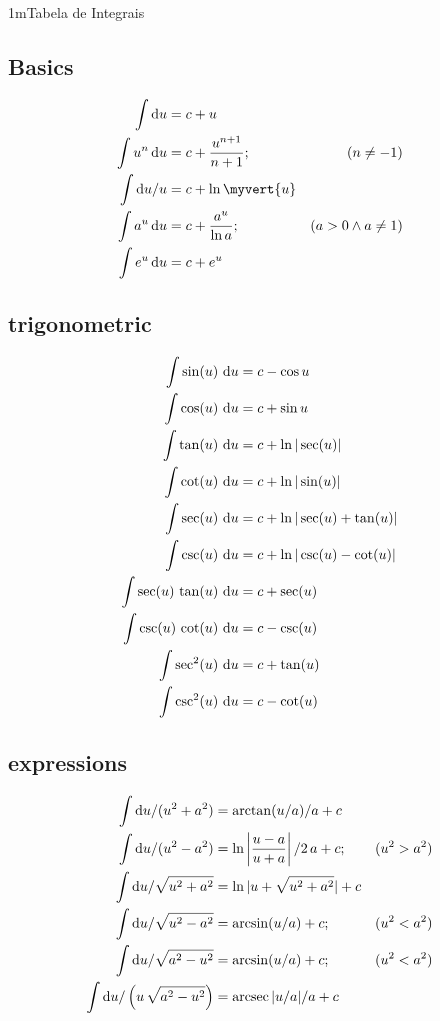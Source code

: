 \documentclass["AM3C-Slides_annotations.tex"]{subfiles}
\begin{document}
\begin{sectionBox}1m{Tabela de Integrais} %
  \subsection*{Basics}
  \begin{align}
       \int       \odif{u}    &= c + u 
    \\ \int   u^n \odif{u}    &= c + \frac{u^{n+1}}{n+1} ;& (n \neq -1) 
    \\ \int \odif{u}/u        &= c + \ln\myvert{u}
    \\ \int   a^u \odif{u}    &= c + \frac{a^u}{\ln{a}} ;& (a > 0 \land a \neq 1)
    \\ \int   e^u \odif{u}    &= c + e^u
  \end{align}

  \subsection*{trigonometric}
    \begin{align}
         \int \sin(u)\,         \odif{u}&= c - \cos{u}
      \\ \int \cos(u)\,         \odif{u}&= c + \sin{u}
      \\ \int \tan(u)\,         \odif{u}&= c + \ln|\sec(u)          |
      \\ \int \cot(u)\,         \odif{u}&= c + \ln|\sin(u)          |
      \\ \int \sec(u)\,         \odif{u}&= c + \ln|\sec(u) + \tan(u)|
      \\ \int \csc(u)\,         \odif{u}&= c + \ln|\csc(u) - \cot(u)|
      \\ \int \sec(u)\,\tan(u)\,\odif{u}&= c + \sec(u)
      \\ \int \csc(u)\,\cot(u)\,\odif{u}&= c - \csc(u)
      \\ \int \sec^2(u)\,       \odif{u}&= c + \tan(u)
      \\ \int \csc^2(u)\,       \odif{u}&= c - \cot(u)
    \end{align}
  \subsection*{expressions}
  \begin{align}
       \int \odif{u}/     (u^2 + a^2) &= \arctan(u/a)/a + c 
    \\ \int \odif{u}/     (u^2 - a^2) &= \ln\left|\frac{u-a}{u+a}\right|/2\,a + c ;& (u^2 > a^2) 
    \\ \int \odif{u}/    \sqrt{u^2 + a^2} &= \ln{|u + \sqrt{u^2+a^2}|} + c 
    \\ \int \odif{u}/    \sqrt{u^2 - a^2} &= \arcsin(u/a) + c ;& (u^2 < a^2) 
    \\ \int \odif{u}/    \sqrt{a^2 - u^2} &= \arcsin(u/a) + c ;& (u^2 < a^2) 
    \\ \int \odif{u}/\left(u\,\sqrt{a^2 - u^2}\right)&= \arcsec|u/a|/a + c  
  \end{align}


\end{sectionBox}
\end{document}
